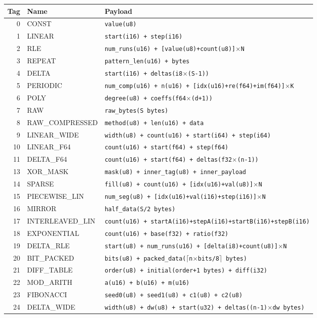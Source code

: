 \documentclass[11pt,a4paper]{article}
\begin{document}
\begin{table}[H]
\centering
\small
\begin{tabular}{@{}rll@{}}
\toprule
\textbf{Tag} & \textbf{Name} & \textbf{Payload} \\
\midrule
0 & CONST & \texttt{value(u8)} \\
1 & LINEAR & \texttt{start(i16) + step(i16)} \\
2 & RLE & \texttt{num\_runs(u16) + [value(u8)+count(u8)]$\times$N} \\
3 & REPEAT & \texttt{pattern\_len(u16) + bytes} \\
4 & DELTA & \texttt{start(i16) + deltas(i8$\times$(S-1))} \\
5 & PERIODIC & \texttt{num\_comp(u16) + n(u16) + [idx(u16)+re(f64)+im(f64)]$\times$K} \\
6 & POLY & \texttt{degree(u8) + coeffs(f64$\times$(d+1))} \\
7 & RAW & \texttt{raw\_bytes(S bytes)} \\
8 & RAW\_COMPRESSED & \texttt{method(u8) + len(u16) + data} \\
9 & LINEAR\_WIDE & \texttt{width(u8) + count(u16) + start(i64) + step(i64)} \\
10 & LINEAR\_F64 & \texttt{count(u16) + start(f64) + step(f64)} \\
11 & DELTA\_F64 & \texttt{count(u16) + start(f64) + deltas(f32$\times$(n-1))} \\
13 & XOR\_MASK & \texttt{mask(u8) + inner\_tag(u8) + inner\_payload} \\
14 & SPARSE & \texttt{fill(u8) + count(u16) + [idx(u16)+val(u8)]$\times$N} \\
15 & PIECEWISE\_LIN & \texttt{num\_seg(u8) + [idx(u16)+val(i16)+step(i16)]$\times$N} \\
16 & MIRROR & \texttt{half\_data(S/2 bytes)} \\
17 & INTERLEAVED\_LIN & \texttt{count(u16) + startA(i16)+stepA(i16)+startB(i16)+stepB(i16)} \\
18 & EXPONENTIAL & \texttt{count(u16) + base(f32) + ratio(f32)} \\
19 & DELTA\_RLE & \texttt{start(u8) + num\_runs(u16) + [delta(i8)+count(u8)]$\times$N} \\
20 & BIT\_PACKED & \texttt{bits(u8) + packed\_data($\lceil$n$\times$bits/8$\rceil$ bytes)} \\
21 & DIFF\_TABLE & \texttt{order(u8) + initial(order+1 bytes) + diff(i32)} \\
22 & MOD\_ARITH & \texttt{a(u16) + b(u16) + m(u16)} \\
23 & FIBONACCI & \texttt{seed0(u8) + seed1(u8) + c1(u8) + c2(u8)} \\
24 & DELTA\_WIDE & \texttt{width(u8) + dw(u8) + start(u32) + deltas((n-1)$\times$dw bytes)} \\
\bottomrule
\end{tabular}
\end{table}
\end{document}
